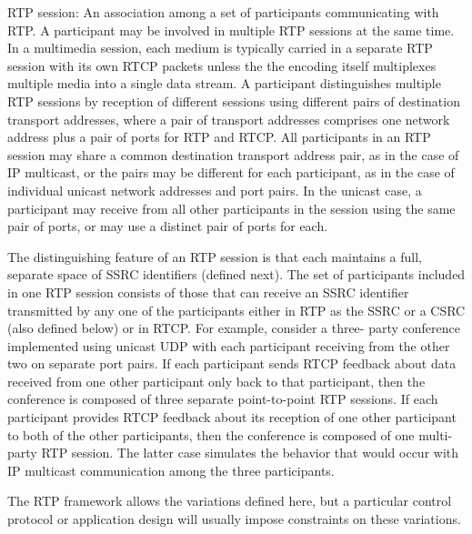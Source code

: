 \documentclass{article}
\begin{document}
RTP session: An association among a set of participants communicating with RTP.  A participant may be involved in multiple RTP sessions at the same time.  In a multimedia session, each medium is typically carried in a separate RTP session with its own RTCP packets unless the the encoding itself multiplexes multiple media into a single data stream.  A participant distinguishes multiple RTP sessions by reception of different sessions using different pairs of destination transport addresses, where a pair of transport addresses comprises one network address plus a pair of ports for RTP and RTCP.  All participants in an RTP session may share a common destination transport address pair, as in the case of IP multicast, or the pairs may be different for each participant, as in the case of individual unicast network addresses and port pairs.  In the unicast case, a participant may receive from all other participants in the session using the same pair of ports, or may use a distinct pair of ports for each.

The distinguishing feature of an RTP session is that each maintains a full, separate space of SSRC identifiers (defined next).  The set of participants included in one RTP session consists of those that can receive an SSRC identifier transmitted by any one of the participants either in RTP as the SSRC or a CSRC (also defined below) or in RTCP.  For example, consider a three- party conference implemented using unicast UDP with each participant receiving from the other two on separate port pairs. If each participant sends RTCP feedback about data received from one other participant only back to that participant, then the conference is composed of three separate point-to-point RTP sessions.  If each participant provides RTCP feedback about its reception of one other participant to both of the other participants, then the conference is composed of one multi-party RTP session.  The latter case simulates the behavior that would occur with IP multicast communication among the three participants.

The RTP framework allows the variations defined here, but a particular control protocol or application design will usually impose constraints on these variations.
\end{document}
